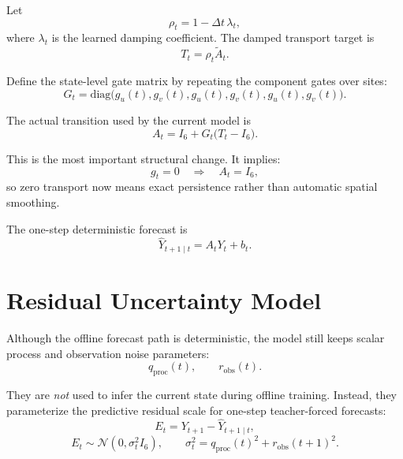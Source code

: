 \documentclass[11pt,a4paper]{article}
\newcommand{\Normal}{\mathcal{N}}
\newcommand{\Id}{I}
\newcommand{\diag}{\mathrm{diag}}
\begin{document}
Let
\begin{equation}
\rho_t = 1 - \Delta t \, \lambda_t,
\end{equation}
where $\lambda_t$ is the learned damping coefficient. The damped transport target is
\begin{equation}
T_t = \rho_t \widetilde{A}_t.
\end{equation}

Define the state-level gate matrix by repeating the component gates over sites:
\begin{equation}
G_t =
\diag\!\bigl(
g_u(t), g_v(t),
g_u(t), g_v(t),
g_u(t), g_v(t)
\bigr).
\end{equation}

The actual transition used by the current model is
\begin{equation}
A_t = \Id_6 + G_t \bigl(T_t - \Id_6 \bigr).
\end{equation}

This is the most important structural change. It implies:
\begin{equation}
g_t = 0
\quad \Longrightarrow \quad
A_t = \Id_6,
\end{equation}
so zero transport now means exact persistence rather than automatic spatial smoothing.

The one-step deterministic forecast is
\begin{equation}
\widehat{Y}_{t+1 \mid t} = A_t Y_t + b_t.
\end{equation}

\section{Residual Uncertainty Model}

Although the offline forecast path is deterministic, the model still keeps scalar process and observation noise parameters:
\begin{equation}
q_{\mathrm{proc}}(t), \qquad r_{\mathrm{obs}}(t).
\end{equation}

They are \emph{not} used to infer the current state during offline training. Instead, they parameterize the predictive residual scale for one-step teacher-forced forecasts:
\begin{equation}
E_t = Y_{t+1} - \widehat{Y}_{t+1 \mid t},
\end{equation}
\begin{equation}
E_t \sim \Normal\!\left(0, \sigma_t^2 \Id_6\right),
\qquad
\sigma_t^2 = q_{\mathrm{proc}}(t)^2 + r_{\mathrm{obs}}(t+1)^2.
\end{equation}
\end{document}
